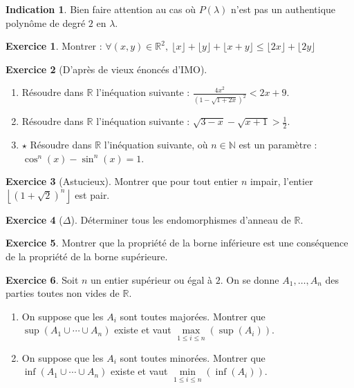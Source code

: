 \documentclass[french]{book}
\newcommand{\N}{\mathbb{N}}
\newcommand{\R}{\mathbb{R}}
\theoremstyle{definition}
\newtheorem{ex}{Exercice}[chapter]
\theoremstyle{theorem}
\newtheorem*{ind}{Indication}
\theoremstyle{remark}
\begin{document}
\begin{ind}
	Bien faire attention au cas où $P(\lambda)$ n'est pas un authentique polynôme de degré $2$ en $\lambda$.
\end{ind}

\begin{ex}
	Montrer : $\forall (x,y)\in\R^2,\ \lfloor x\rfloor +\lfloor y\rfloor+\lfloor x+y\rfloor \leqslant \lfloor 2x\rfloor+\lfloor 2y\rfloor$
\end{ex}

\begin{ex}[D'après de vieux énoncés d'IMO]
	\begin{enumerate}
		\item Résoudre dans $\R$ l'inéquation suivante : $\displaystyle\frac{4x^2}{\left(1-\sqrt{1+2x}\right)^2}<2x+9$.
		\item Résoudre dans $\R$ l'inéquation suivante : $\sqrt{3-x}-\sqrt{x+1}>\displaystyle\frac{1}{2}$.
		\item $\star$ Résoudre dans $\R$ l'inéquation suivante, où $n\in\N$ est un paramètre : $\cos^n(x)-\sin^n(x)=1$.
	\end{enumerate}
\end{ex}

\begin{ex}[Astucieux]
	Montrer que pour tout entier $n$ impair, l'entier $\left\lfloor (1+\sqrt{2})^n\right\rfloor$ est pair.
\end{ex}

\begin{ex}[$\Delta$]
	Déterminer tous les endomorphismes d'anneau de $\R$.
\end{ex}

\begin{ex}
	Montrer que la propriété de la borne inférieure est une conséquence de la propriété de la borne supérieure.
\end{ex}

\begin{ex}
	Soit $n$ un entier supérieur ou égal à $2$. On se donne $A_1,\ldots,A_n$ des parties toutes non vides de $\R$.
	\begin{enumerate}
		\item On suppose que les $A_i$ sont toutes majorées. Montrer que $\sup(A_1\cup\cdots\cup A_n)$ existe et vaut $\displaystyle\underset{1\leqslant i\leqslant n}{\max}(\sup(A_i))$.
		\item On suppose que les $A_i$ sont toutes minorées. Montrer que $\inf(A_1\cup\cdots\cup A_n)$ existe et vaut $\displaystyle\underset{1\leqslant i\leqslant n}{\min}(\inf(A_i))$.
	\end{enumerate}
\end{ex}
\end{document}
